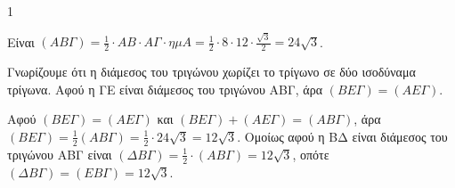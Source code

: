 \begin{ylh}{1}
    \item [Εμβαδόν τριγώνου, Διάμεσοι]
\end{ylh}
\begin{figure}
    \vspace{-1em}
\end{figure}
\begin{alist}
    \item[α)] Είναι $(ΑΒΓ) = \frac{1}{2} \cdot ΑΒ \cdot ΑΓ \cdot \eta\mu A= \frac{1}{2} \cdot 8 \cdot 12 \cdot \frac{\sqrt{3}}{2} = 24\sqrt{3}$.

    \item[β)]
    \begin{rlist}
        \item Γνωρίζουμε ότι η διάμεσος του τριγώνου χωρίζει το τρίγωνο σε δύο ισοδύναμα τρίγωνα. Αφού η ΓΕ είναι διάμεσος του τριγώνου ΑΒΓ, άρα $(ΒΕΓ)=(ΑΕΓ)$.
        \item Αφού $(ΒΕΓ)=(ΑΕΓ)$ και $(ΒΕΓ)+(ΑΕΓ)=(ΑΒΓ)$, άρα $(ΒΕΓ) = \frac{1}{2}(ΑΒΓ)=\frac{1}{2} \cdot 24\sqrt{3}=12\sqrt{3}$. Ομοίως αφού η ΒΔ είναι διάμεσος του τριγώνου ΑΒΓ είναι $(ΔΒΓ)=\frac{1}{2} \cdot (ΑΒΓ) = 12\sqrt{3}$, οπότε $(ΔΒΓ)=(ΕΒΓ)= 12\sqrt{3}$.
    \end{rlist}
\end{alist}